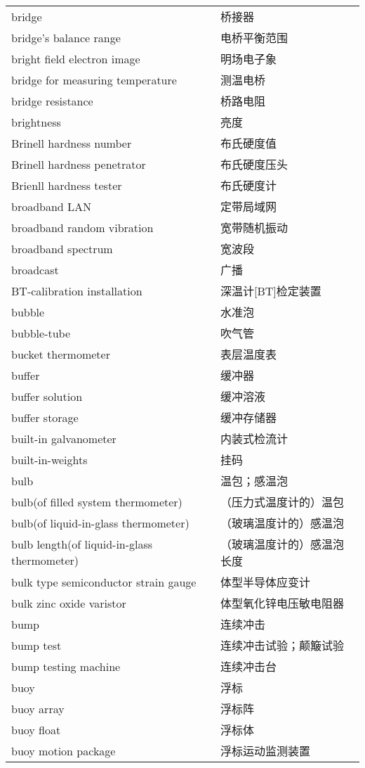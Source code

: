 \documentclass[
]{article}
\begin{document}
\begin{longtable}[]{@{}ll@{}}
bridge & 桥接器 \\
bridge's balance range & 电桥平衡范围 \\
bright field electron image & 明场电子象 \\
bridge for measuring temperature & 测温电桥 \\
bridge resistance & 桥路电阻 \\
brightness & 亮度 \\
Brinell hardness number & 布氏硬度值 \\
Brinell hardness penetrator & 布氏硬度压头 \\
Brienll hardness tester & 布氏硬度计 \\
broadband LAN & 定带局域网 \\
broadband random vibration & 宽带随机振动 \\
broadband spectrum & 宽波段 \\
broadcast & 广播 \\
BT-calibration installation & 深温计{[}BT{]}检定装置 \\
bubble & 水准泡 \\
bubble-tube & 吹气管 \\
bucket thermometer & 表层温度表 \\
buffer & 缓冲器 \\
buffer solution & 缓冲溶液 \\
buffer storage & 缓冲存储器 \\
built-in galvanometer & 内装式检流计 \\
built-in-weights & 挂码 \\
bulb & 温包；感温泡 \\
bulb(of filled system thermometer) & （压力式温度计的）温包 \\
bulb(of liquid-in-glass thermometer) & （玻璃温度计的）感温泡 \\
bulb length(of liquid-in-glass thermometer) &
（玻璃温度计的）感温泡长度 \\
bulk type semiconductor strain gauge & 体型半导体应变计 \\
bulk zinc oxide varistor & 体型氧化锌电压敏电阻器 \\
bump & 连续冲击 \\
bump test & 连续冲击试验；颠簸试验 \\
bump testing machine & 连续冲击台 \\
buoy & 浮标 \\
buoy array & 浮标阵 \\
buoy float & 浮标体 \\
buoy motion package & 浮标运动监测装置 \\

\end{longtable}
\end{document}
